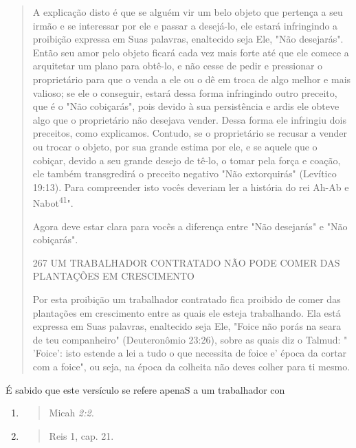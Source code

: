 \begin{quote}
A explicação disto é que se alguém vir um belo objeto que pertença a seu
irmão e se interessar por ele e passar a desejá-lo, ele estará
infringindo a proibição expressa em Suas palavras, enaltecido seja Ele,
"Não desejarás". Então seu amor pelo objeto ficará cada vez mais forte
até que ele comece a arquitetar um plano para obtê-lo, e não cesse de
pedir e pressionar o proprietário para que o venda a ele ou o dê em
troca de algo melhor e mais valioso; se ele o conseguir, estará dessa
forma infringindo outro preceito, que é o "Não cobiça­rás", pois devido
à sua persistência e ardis ele obteve algo que o proprietário não
desejava vender. Dessa forma ele infringiu dois preceitos, como
explica­mos. Contudo, se o proprietário se recusar a vender ou trocar o
objeto, por sua grande estima por ele, e se aquele que o cobiçar, devido
a seu grande dese­jo de tê-lo, o tomar pela força e coação, ele também
transgredirá o preceito negativo "Não extorquirás" (Levítico 19:13).
Para compreender isto vocês de­veriam ler a história do rei Ah-Ab e
Nabot\textsuperscript{41}".

Agora deve estar clara para vocês a diferença entre "Não desejarás" e
"Não cobiçarás".

267 UM TRABALHADOR CONTRATADO NÃO PODE COMER DAS PLANTAÇÕES EM
CRESCIMENTO

Por esta proibição um trabalhador contratado fica proibido de co­mer das
plantações em crescimento entre as quais ele esteja trabalhando. Ela
está expressa em Suas palavras, enaltecido seja Ele, "Foice não porás na
seara de teu companheiro" (Deuteronômio 23:26), sobre as quais diz o
Talmud: " 'Foi­ce': isto estende a lei a tudo o que necessita de foice
e' época da cortar com a foice", ou seja, na época da colheita não deves
colher para ti mesmo.
\end{quote}

É sabido que este versículo se refere apenaS a um trabalhador con

\begin{enumerate}
\def\labelenumi{\arabic{enumi}.}
\setcounter{enumi}{408}
\item
  \begin{quote}
  Micah \emph{2:2.}
  \end{quote}
\item
  \begin{quote}
  Reis 1, cap. 21.
  \end{quote}
\end{enumerate}

